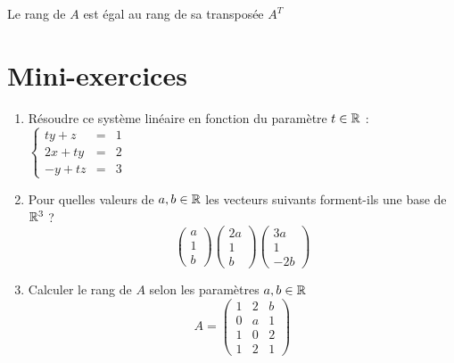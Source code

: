 \begin{frame}
\begin{proposition}
Le rang de $A$ est égal au rang de sa transposée $A^T$
\end{proposition}


\end{frame}


\section{Mini-exercices}

\begin{frame}
\begin{miniexercice}
\begin{enumerate}
  \item Résoudre ce système linéaire en fonction du paramètre $t\in\mathbb{R}$ :
  $\left\{\begin{array}{rcl}ty+z&=&1\\2x+ty&=&2\\-y+tz&=&3\end{array} \right.$

  \item Pour quelles valeurs de $a,b \in \mathbb{R}$ les vecteurs suivants 
  forment-ils une base de $\mathbb{R}^3$ ?
  $$\begin{pmatrix}a\\1\\b\end{pmatrix} \begin{pmatrix}2a\\1\\b\end{pmatrix}
  \begin{pmatrix}3a\\1\\-2b\end{pmatrix}$$

  \item Calculer le rang de $A$ selon les paramètres $a,b\in\mathbb{R}$
  $$A=\begin{pmatrix}1&2&b\\0&a&1\\1&0&2\\1&2&1\end{pmatrix}$$

\end{enumerate}
\end{miniexercice}
\end{frame}

